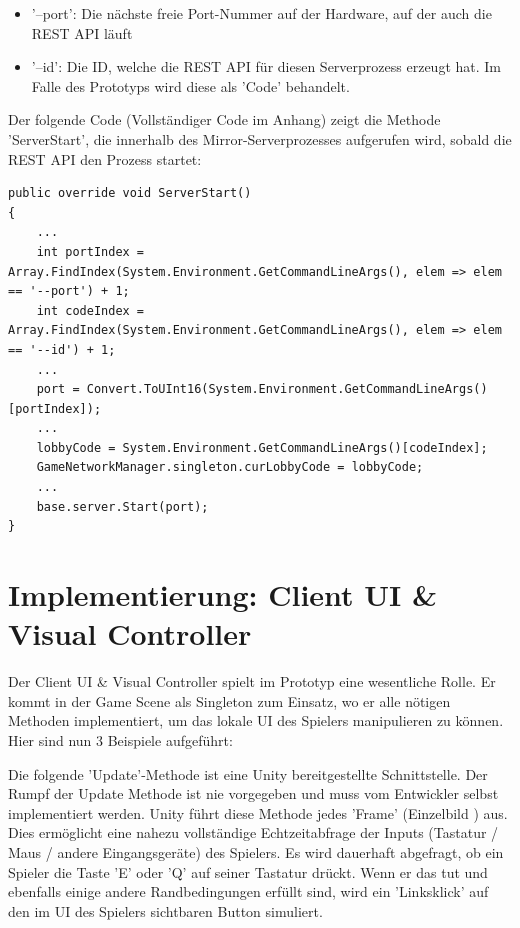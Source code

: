 \begin{itemize}
	\item '--port': Die nächste freie Port-Nummer auf der Hardware, auf der auch die REST API läuft
	\item '--id': Die ID, welche die REST API für diesen Serverprozess erzeugt hat. Im Falle des Prototyps wird diese als 'Code' behandelt.
\end{itemize}

Der folgende Code (Vollständiger Code im Anhang) zeigt die Methode 'ServerStart', die innerhalb des Mirror-Serverprozesses aufgerufen wird, sobald die REST API den Prozess startet: 

\begin{lstlisting}[caption= OwnKcpTransport.cs ServerStart()]
public override void ServerStart()
{
	...
	int portIndex = Array.FindIndex(System.Environment.GetCommandLineArgs(), elem => elem == '--port') + 1;
	int codeIndex = Array.FindIndex(System.Environment.GetCommandLineArgs(), elem => elem == '--id') + 1;
	...
	port = Convert.ToUInt16(System.Environment.GetCommandLineArgs()[portIndex]);
	...
	lobbyCode = System.Environment.GetCommandLineArgs()[codeIndex];
	GameNetworkManager.singleton.curLobbyCode = lobbyCode;
	...
	base.server.Start(port);
}
\end{lstlisting}


\section{Implementierung: Client UI \& Visual Controller}
\label{implementierung:client_UI_Controller}

Der Client UI \& Visual Controller spielt im Prototyp eine wesentliche Rolle. Er kommt in der Game Scene als Singleton \cite{M.Gatrell.2009} zum Einsatz, wo er alle nötigen Methoden implementiert, um das lokale UI des Spielers manipulieren zu können. Hier sind nun 3 Beispiele aufgeführt:

Die folgende 'Update'-Methode ist eine Unity bereitgestellte Schnittstelle. Der Rumpf der Update Methode ist nie vorgegeben und muss vom Entwickler selbst implementiert werden. Unity führt diese Methode jedes 'Frame' (Einzelbild \cite{Whaley.21.11.2018}) aus. Dies ermöglicht eine nahezu vollständige Echtzeitabfrage der Inputs (Tastatur / Maus / andere Eingangsgeräte) des Spielers. Es wird dauerhaft abgefragt, ob ein Spieler die Taste 'E' oder 'Q' auf seiner Tastatur drückt. Wenn er das tut und ebenfalls einige andere Randbedingungen erfüllt sind, wird ein 'Linksklick' auf den im UI des Spielers sichtbaren Button simuliert.

